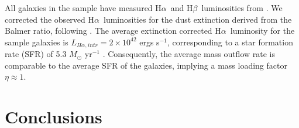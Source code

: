 \documentclass[manuscript]{emulateapj}
\newcommand{\ha}{H$\alpha$}
\newcommand{\hb}{H$\beta$}
\begin{document}
All galaxies in the sample have measured \ha\ and \hb\ luminosities
from \citet{atek2014,cowie2011,scarlata2009}. We corrected the
observed \ha\ luminosities for the dust extinction derived from the
Balmer ratio, following
\citet[e.g.][]{dominguez2013}. The average extinction corrected \ha\
luminosity for the sample galaxies is $L_{H\alpha , intr} =2\times
10^{42}$ ergs s$^{-1}$, corresponding to a star formation rate (SFR)
of 5.3 $M_{\odot}$ yr$^{-1}$ \citep[][]{kennicutt2012}.  Consequently,
the average mass outflow rate is comparable to the average SFR of the
galaxies, implying a mass loading factor $\eta \approx 1$. 






\section{Conclusions}
\end{document}
